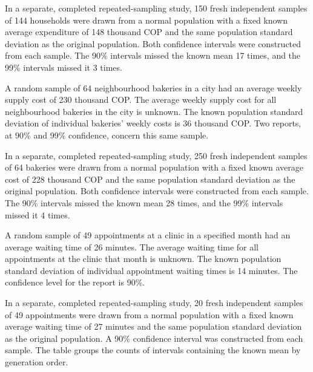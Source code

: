 In a separate, completed repeated-sampling study, 150 fresh independent samples of 144 households were drawn from a normal population with a fixed known average expenditure of 148 thousand COP and the same population standard deviation as the original population. Both confidence intervals were constructed from each sample. The 90\% intervals missed the known mean 17 times, and the 99\% intervals missed it 3 times.


A random sample of 64 neighbourhood bakeries in a city had an average weekly supply cost of 230 thousand COP. The average weekly supply cost for all neighbourhood bakeries in the city is unknown. The known population standard deviation of individual bakeries' weekly costs is 36 thousand COP. Two reports, at 90\% and 99\% confidence, concern this same sample.

In a separate, completed repeated-sampling study, 250 fresh independent samples of 64 bakeries were drawn from a normal population with a fixed known average cost of 228 thousand COP and the same population standard deviation as the original population. Both confidence intervals were constructed from each sample. The 90\% intervals missed the known mean 28 times, and the 99\% intervals missed it 4 times.


A random sample of 49 appointments at a clinic in a specified month had an average waiting time of 26 minutes. The average waiting time for all appointments at the clinic that month is unknown. The known population standard deviation of individual appointment waiting times is 14 minutes. The confidence level for the report is 90\%.

In a separate, completed repeated-sampling study, 20 fresh independent samples of 49 appointments were drawn from a normal population with a fixed known average waiting time of 27 minutes and the same population standard deviation as the original population. A 90\% confidence interval was constructed from each sample. The table groups the counts of intervals containing the known mean by generation order.

